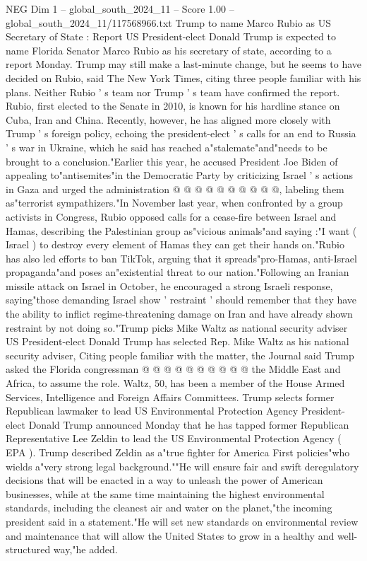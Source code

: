 \begin{textsample}{NEG Dim 1 – global\_south\_2024\_11 – Score 1.00 – global\_south\_2024\_11/117568966.txt}  \label{ex:f1_neg_207}
Trump to name Marco Rubio as US Secretary of State : Report US President-elect Donald Trump is expected to name Florida Senator Marco Rubio as his secretary of state, according to a report Monday.
Trump may still make a last-minute change, but he seems to have decided on Rubio, said The New York Times, citing three people familiar with his plans.
Neither Rubio ' s team nor Trump ' s team have confirmed the report.
Rubio, first elected to the Senate in 2010, is known for his hardline stance on Cuba, Iran and China.
Recently, however, he has aligned more closely with Trump ' s foreign policy, echoing the president-elect ' s calls for an end to Russia ' s war in Ukraine, which he said has reached a"stalemate"and"needs to be brought to a conclusion."Earlier this year, he accused President Joe Biden of appealing to"antisemites"in the Democratic Party by criticizing Israel ' s actions in Gaza and urged the administration @ @ @ @ @ @ @ @ @ @, labeling them as"terrorist sympathizers."In November last year, when confronted by a group activists in Congress, Rubio opposed calls for a cease-fire between Israel and Hamas, describing the Palestinian group as"vicious animals"and saying :"I want ( Israel ) to destroy every element of Hamas they can get their hands on."Rubio has also led efforts to ban TikTok, arguing that it spreads"pro-Hamas, anti-Israel propaganda"and poses an"existential threat to our nation."Following an Iranian missile attack on Israel in October, he encouraged a strong Israeli response, saying"those demanding Israel show ' restraint ' should remember that they have the ability to inflict regime-threatening damage on Iran and have already shown restraint by not doing so."Trump picks Mike Waltz as national security adviser US President-elect Donald Trump has selected Rep.
Mike Waltz as his national security adviser, Citing people familiar with the matter, the Journal said Trump asked the Florida congressman @ @ @ @ @ @ @ @ @ @ the Middle East and Africa, to assume the role.
Waltz, 50, has been a member of the House Armed Services, Intelligence and Foreign Affairs Committees.
Trump selects former Republican lawmaker to lead US Environmental Protection Agency President-elect Donald Trump announced Monday that he has tapped former Republican Representative Lee Zeldin to lead the US Environmental Protection Agency ( EPA ).
Trump described Zeldin as a"true fighter for America First policies"who wields a"very strong legal background.""He will ensure fair and swift deregulatory decisions that will be enacted in a way to unleash the power of American businesses, while at the same time maintaining the highest environmental standards, including the cleanest air and water on the planet,"the incoming president said in a statement."He will set new standards on environmental review and maintenance that will allow the United States to grow in a healthy and well-structured way,"he added.

\end{textsample}
